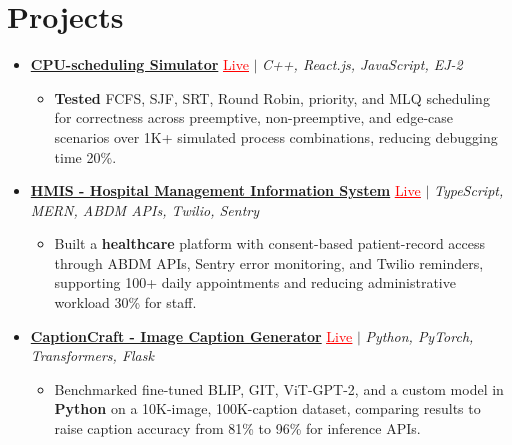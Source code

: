 \documentclass[letterpaper,10pt]{article}
\newcommand{\itemTail}{\vspace{-4pt}}
\newcommand{\projGap}{\vspace{3pt}}
\newcommand{\resumeItem}[1]{\item\small{{#1 \itemTail}}}
\newcommand{\resumeProjectHeading}[1]{\item \small #1 \vspace{-2pt}}
\newcommand{\resumeProjectLink}[2]{\href{#1}{\textcolor{red}{\underline{#2}}}}
\newcommand{\resumeSubHeadingListStart}{\begin{itemize}[leftmargin=0.0in, label={}]}
\newcommand{\resumeSubHeadingListEnd}{\end{itemize}}
\newcommand{\resumeProjItemListStart}{\begin{itemize}[leftmargin=0.15in,label=\textbullet,itemsep=3pt,topsep=0pt,parsep=0pt,partopsep=0pt]}
\newcommand{\resumeProjItemListEnd}{\end{itemize}\vspace{-4pt}}
\begin{document}
\section{Projects}
\resumeSubHeadingListStart
\vspace{-2pt}
\resumeProjectHeading{\href{https://cpu-scheduler-amber.vercel.app/}{\textbf{CPU-scheduling Simulator}} \resumeProjectLink{https://cpu-scheduler-amber.vercel.app/}{Live} $|$ \emph{C++, React.js, JavaScript, EJ-2}}
\resumeProjItemListStart
\resumeItem{\textbf{Tested} FCFS, SJF, SRT, Round Robin, priority, and MLQ scheduling for correctness across preemptive, non-preemptive, and edge-case scenarios over 1K+ simulated process combinations, reducing debugging time 20\%.}
\resumeProjItemListEnd
\projGap
\resumeProjectHeading{\href{https://hims-rouge.vercel.app/}{\textbf{HMIS - Hospital Management Information System}} \resumeProjectLink{https://hims-rouge.vercel.app/}{Live} $|$ \emph{TypeScript, MERN, ABDM APIs, Twilio, Sentry}}
\resumeProjItemListStart
\resumeItem{Built a \textbf{healthcare} platform with consent-based patient-record access through ABDM APIs, Sentry error monitoring, and Twilio reminders, supporting 100+ daily appointments and reducing administrative workload 30\% for staff.}
\resumeProjItemListEnd
\projGap
\resumeProjectHeading{\href{https://imagecaptiongenerator.com/}{\textbf{CaptionCraft - Image Caption Generator}} \resumeProjectLink{https://imagecaptiongenerator.com/}{Live} $|$ \emph{Python, PyTorch, Transformers, Flask}}
\resumeProjItemListStart
\resumeItem{Benchmarked fine-tuned BLIP, GIT, ViT-GPT-2, and a custom model in \textbf{Python} on a 10K-image, 100K-caption dataset, comparing results to raise caption accuracy from 81\% to 96\% for inference APIs.}
\resumeProjItemListEnd
\resumeSubHeadingListEnd
\end{document}
